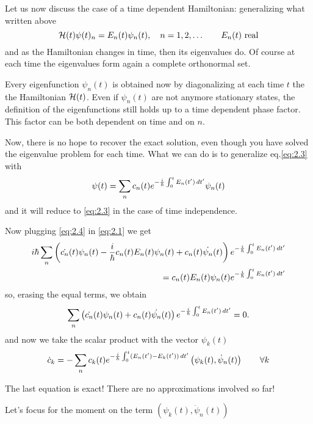 Let us now discuss the case of a time dependent Hamiltonian: generalizing what written above
\begin{equation}
\mathcal{H}(t) \psi(t)_n=E_n(t)\psi_n(t), \quad n=1,2,\dots \qquad E_n(t) \text{ real} 
\end{equation}
and as the Hamiltonian changes in time, then its eigenvalues do. Of course at each time the eigenvalues form again a complete orthonormal set.
\begin{rem}
	Every eigenfunction $ \psi_n(t) $ is obtained now by diagonalizing at each time $ t $ the the Hamiltonian $ \mathcal{H}(t) $. Even if $ \psi_n(t) $ are not anymore stationary states, the definition  of the eigenfunctions still holds up to a time dependent phase factor. This factor can be both dependent on time and on $ n $.
\end{rem}
Now, there is no hope to recover the exact solution, even though you have solved the eigenvalue problem for each time. What we can do is to generalize eq.\eqref{eq:2.3} with
\begin{equation}
\psi(t)=\sum_n c_n(t)e^{-\frac{i}{\hbar}\int_{0}^{t}E_n(t')\mathop{}\!d t'}\psi_n(t)
\label{eq:2.4}
\end{equation}
and it will reduce to \eqref{eq:2.3} in the case of time independence.

Now plugging \eqref{eq:2.4} in \eqref{eq:2.1} we get 
\begin{align}
i\hbar\sum_n\left(\dot{c_n}(t)\psi_n(t)-\frac{i}{\hbar}c_n(t)E_n(t)\psi_n(t)+c_n(t)\dot{\psi_n}(t) \right)e^{-\frac{i}{\hbar}\int_{0}^{t}E_n(t')\mathop{}\!d t'}\\
=c_n(t)E_n(t)\psi_n(t)e^{-\frac{i}{\hbar}\int_{0}^{t}E_n(t')\mathop{}\!d t'}
\end{align}
so, erasing the equal terms, we obtain
\begin{align}
\sum_n\left(\dot{c_n}(t)\psi_n(t)+c_n(t)\dot{\psi_n}(t) \right)e^{-\frac{i}{\hbar}\int_{0}^{t}E_n(t')\mathop{}\!d t'}=0.
\label{eq:2.5}
\end{align}
and now we take the scalar product with the vector $ \psi_k(t) $
\begin{equation}
\dot{c}_k=-\sum_n c_k(t)e^{-\frac{i}{\hbar}\int_{0}^{t}(E_n(t')-E_k(t'))\mathop{}\!d t'} \left(\psi_k(t),\dot{\psi}_n(t) \right) \qquad \forall k 
\end{equation}
\begin{rem}
	The last equation is exact! There are no approximations involved so far!
\end{rem}

Let's focus for the moment on the term $ \left(\psi_k(t),\dot{\psi}_n(t) \right) $


